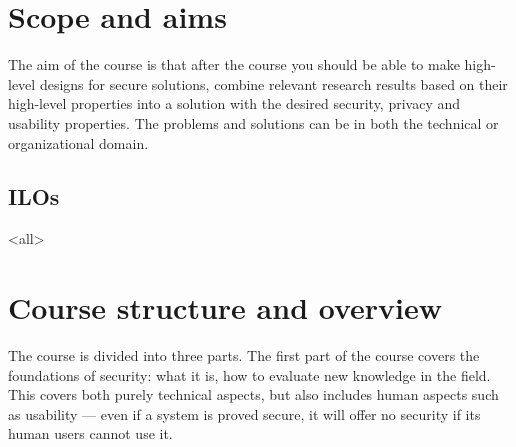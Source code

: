 \mode*

\section{Scope and aims}%
\label{sec:aim}

The aim of the course is that after the course you should be able to make 
high-level designs for secure solutions, \ie combine relevant research results 
based on their high-level properties into a solution with the desired security, 
privacy and usability properties.
The problems and solutions can be in both the technical or organizational 
domain.


\subsection{\Aclp*{ILO}}
\mode<all>{%

}


\section{Course structure and overview}%
\label{CourseStructure}

The course is divided into three parts.
The first part of the course covers the foundations of security: what it is, 
how to evaluate new knowledge in the field.
This covers both purely technical aspects, but also includes human aspects such
as usability --- even if a system is proved secure, it will offer no security 
if its human users cannot use it.


